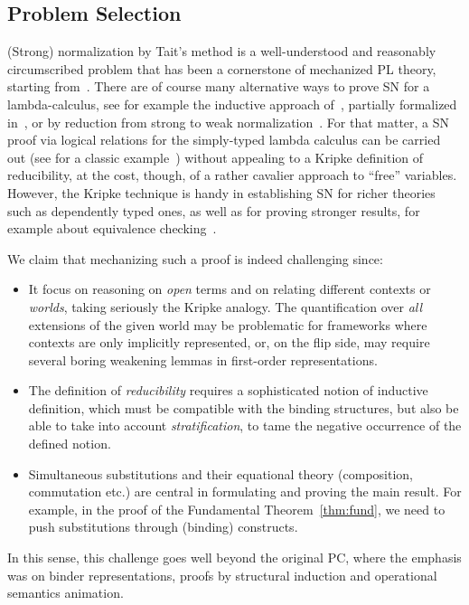 
\subsection{Problem Selection}
\label{ssec:select}

(Strong) normalization by Tait's method is a well-understood and
reasonably circumscribed problem that has been a cornerstone of
mechanized PL theory, starting from~\citep{Altenkirch93}. There are of
course many alternative ways to prove SN for a lambda-calculus, see
for example the inductive approach of~\citep{Joachimski2003},
partially formalized in~\citep{ABEL20083}, or by reduction from strong
to weak normalization~\cite{SORENSEN199735}. For that matter, a SN
proof via logical relations for the simply-typed lambda calculus can
be carried out (see for a classic example~\citep{girardLafontTaylor})
{without} appealing to a Kripke definition of reducibility, at the
cost, though, of a rather cavalier approach to ``free''
variables. However, the Kripke technique is handy in establishing SN for richer
theories such as dependently typed ones, as well as for proving
stronger results, for example about equivalence
checking~\citep{Crary:ATAPL,Harper03tocl}.




We claim that mechanizing such a proof is
indeed challenging since:

\begin{itemize}
\item It focus on reasoning on \emph{open} terms and on relating
  different contexts or \emph{worlds}, taking seriously the Kripke
  analogy. The quantification over \emph{all} extensions of the given
  world may be problematic for frameworks where contexts are only
  implicitly represented, or, on the flip side, may require several
  boring weakening lemmas in first-order representations.
\item The definition of \emph{reducibility} requires a sophisticated
  notion of inductive definition, which must be compatible with the
  binding structures, but also be able to take into account
  \emph{stratification}, to tame the negative occurrence of the
  defined notion.
\item Simultaneous substitutions and their equational theory
  (composition, commutation etc.) are central in formulating and
  proving the main result. For example, in the proof of the Fundamental
  Theorem~\ref{thm:fund}, we need to push substitutions through
  (binding) constructs.
\end{itemize}
%
In this sense, this challenge goes well beyond the original PC, where
the emphasis was on binder representations, proofs by structural
induction and operational semantics animation.


